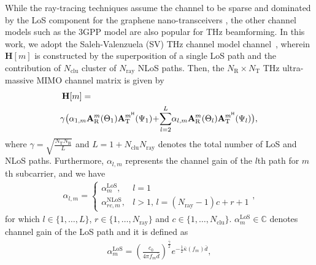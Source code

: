 \documentclass[journal,10pt]{IEEEtran}
\begin{document}
{		While the ray-tracing techniques assume the channel to be sparse and dominated by the LoS component for the graphene nano-transceivers \cite{ummimoTareqOverview}, the other channel models such as the 3GPP model \cite{3gppChannelModelThz,umMIMO3gpp_IRS} are also popular for THz beamforming. In this work, we adopt the Saleh-Valenzuela (SV) THz channel model channel~\cite{ummimoHBThzSVModel,ummimoTareq}, wherein $\mathbf{H}[m]$ is constructed by the superposition of a single LoS path and the contribution of $N_\mathrm{clu}$ cluster of $N_\mathrm{ray}$ NLoS paths. Then, the $N_\mathrm{R}\times N_\mathrm{T}$ THz ultra-massive MIMO channel matrix is given by~\cite{teraMIMO}
		\begin{align}
		\label{channelMatrixCSI}
		&\mathbf{H}[m] = \nonumber \\
		&  \hspace{-2pt}\gamma \big( \alpha_{1,m}  \mathbf{A}_\mathrm{R}^m(\Theta_{1}) \mathbf{A}_\mathrm{T}^{m^\textsf{H}}(\Psi_1)  \hspace{-2pt}  + \hspace{-2pt}
		\sum_{l=2}^{L} \hspace{-2pt} \alpha_{l,m} \mathbf{A}_\mathrm{R}^m(\Theta_{l})\mathbf{A}_\mathrm{T}^{m^\textsf{H}}(\Psi_{l}) \big),
		\end{align}
		where $\gamma = \sqrt{\frac{N_\mathrm{T}N_\mathrm{R}}{L}}$ and $L = 1 + N_\mathrm{clu}N_\mathrm{ray}$ denotes the total number of LoS and NLoS paths. Furthermore, $\alpha_{l,m}$ represents the channel gain of the $l$th path for $m$th subcarrier, and we have 
		\begin{align}
		\alpha_{l,m} = \left\{\begin{array}{ll}  \alpha_m^\mathrm{LoS}, & l=1 \\
		\alpha_{rc,m}^\mathrm{NLoS}, & l>1, \hspace{2pt} l= (N_\mathrm{ray}-1)c + r  +1
		\end{array}\right.,
		\end{align}
		for which $l \in \{1,\dots, L\}$, $r\in \{1,\dots, N_\mathrm{ray}\}$ and $c \in \{1,\dots, N_\mathrm{clu}\}$.  $\alpha_m^\mathrm{LoS}\in \mathbb{C}$ denotes channel gain of the LoS path and it is defined as
		\begin{align}
		\label{alphaLoS}
		\alpha_m^{\mathrm{LoS}} = (\frac{c_0}{4 \pi f_m \bar{d} })^{\frac{\bar{\gamma}}{2}} e^{-\frac{1}{2} \bar{\kappa}(f_m) \bar{d}},

\end{align}}
\end{document}
